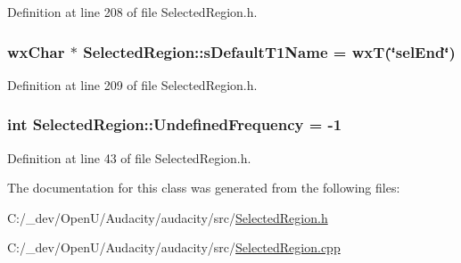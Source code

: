 Definition at line 208 of file Selected\+Region.\+h.

\subsubsection[{\texorpdfstring{s\+Default\+T1\+Name}{sDefaultT1Name}}]{ wx\+Char $\ast$ Selected\+Region\+::s\+Default\+T1\+Name = wxT(\char`\"{}sel\+End\char`\"{})\hspace{0.3cm}{\ttfamily [static]}}\hypertarget{class_selected_region_a32ec0f68631275c0abf57eb1deadaf20}{}\label{class_selected_region_a32ec0f68631275c0abf57eb1deadaf20}


Definition at line 209 of file Selected\+Region.\+h.

\subsubsection[{\texorpdfstring{Undefined\+Frequency}{UndefinedFrequency}}]{ {\bf int} Selected\+Region\+::\+Undefined\+Frequency = -\/1\hspace{0.3cm}{\ttfamily [static]}}\hypertarget{class_selected_region_aeb44ed227fd0a3396dc40f57efe3d432}{}\label{class_selected_region_aeb44ed227fd0a3396dc40f57efe3d432}


Definition at line 43 of file Selected\+Region.\+h.



The documentation for this class was generated from the following files\+:\begin{DoxyCompactItemize}
\item 
C\+:/\+\_\+dev/\+Open\+U/\+Audacity/audacity/src/\hyperlink{_selected_region_8h}{Selected\+Region.\+h}\item 
C\+:/\+\_\+dev/\+Open\+U/\+Audacity/audacity/src/\hyperlink{_selected_region_8cpp}{Selected\+Region.\+cpp}\end{DoxyCompactItemize}
